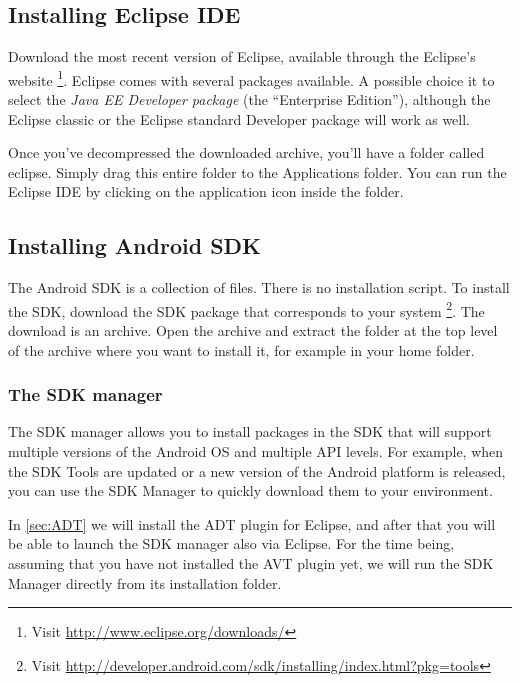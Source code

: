 \subsection{Installing Eclipse IDE\label{sec:Eclipse}}

Download the most recent version of Eclipse, available through
the Eclipse's website%
\footnote{Visit \url{http://www.eclipse.org/downloads/}}.  
Eclipse comes with several packages available.
A possible choice it to select 
the \emph{Java EE Developer package} (the ``Enterprise
Edition''), although the Eclipse classic or the Eclipse standard Developer
package will work as well.

Once you've decompressed the downloaded archive, you'll have a folder called eclipse.
Simply drag this entire folder to the Applications folder.
You can run the Eclipse IDE by clicking on the application icon inside the
folder.

\subsection{Installing Android SDK\label{sec:SDK}}

The Android SDK is a collection of files. 
There is no installation script.
To install the SDK, download the SDK package that corresponds to your system%
\footnote{Visit
   \url{http://developer.android.com/sdk/installing/index.html?pkg=tools}}.
The download is an archive.
Open the archive and extract the folder at the top level of the archive where
you want to install it, for example in your home folder.


\subsubsection{The SDK manager\label{sec:SDK_manager}}

The SDK manager allows you to install packages in the SDK that will support
multiple versions of the Android OS and multiple API levels.
For example, when the SDK Tools are updated or a new version of the Android
platform is released, you can use the SDK Manager to quickly download them to
your environment.

In \cref{sec:ADT} we will install the ADT plugin for Eclipse, and after that
you will be able to launch the SDK manager also via Eclipse.
For the time being, assuming that you have not installed the AVT plugin yet, we
will run the SDK Manager directly from its installation folder. 

